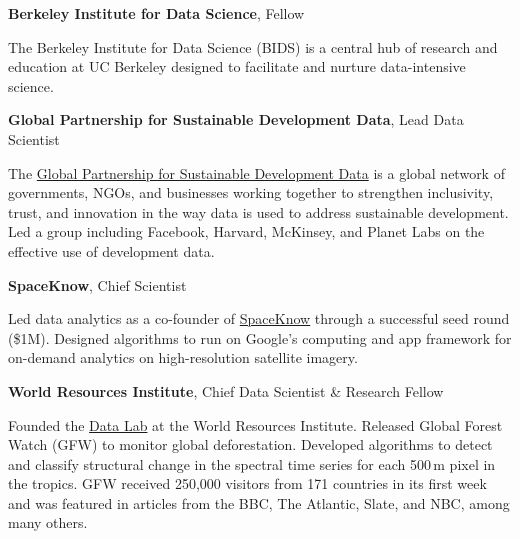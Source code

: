 \documentclass[10pt,letterpaper]{article}
\renewenvironment{itemize}{
  \begin{list}{}{
    \setlength{\leftmargin}{1.5em}
    \setlength{\itemsep}{0.25em}
    \setlength{\parskip}{0pt}
    \setlength{\parsep}{0.25em}
  }
}{
  \end{list}
}
\begin{document}
\begin{itemize}
\item \textbf{Berkeley Institute for Data Science}, Fellow
  \begin{itemize}
  \item The Berkeley Institute for Data Science (BIDS) is a central hub of research and education at UC Berkeley designed to facilitate and nurture data-intensive science.
  \end{itemize}

\item \textbf{Global Partnership for Sustainable Development Data}, Lead Data Scientist
  \begin{itemize}
  \item The \href{http://www.data4sdgs.org}{Global Partnership for Sustainable Development Data} is a global network of governments, NGOs, and businesses working together to strengthen inclusivity, trust, and innovation in the way data is used to address sustainable development. Led a group including Facebook, Harvard, McKinsey, and Planet Labs on the effective use of development data.
  \end{itemize}


\item \textbf{SpaceKnow}, Chief Scientist
  \begin{itemize}
  \item Led data analytics as a co-founder of \href{http://www.spaceknow.com}{SpaceKnow} through a successful seed round (\$1M). Designed algorithms to run on Google's computing and app framework for on-demand analytics on high-resolution satellite imagery.
  \end{itemize}

\item \textbf{World Resources Institute}, Chief Data Scientist \& Research Fellow %
  \begin{itemize}
  \item Founded the \href{http://datalab.wri.org/}{Data Lab} at the World Resources Institute. Released Global Forest Watch (GFW) to monitor global deforestation. Developed algorithms to detect and classify structural change in the spectral time series for each 500\,m pixel in the tropics. GFW received 250,000 visitors from 171 countries in its first week and was featured in articles from the BBC, The Atlantic, Slate, and NBC, among many others.
  \end{itemize}


\end{itemize}
\end{document}
